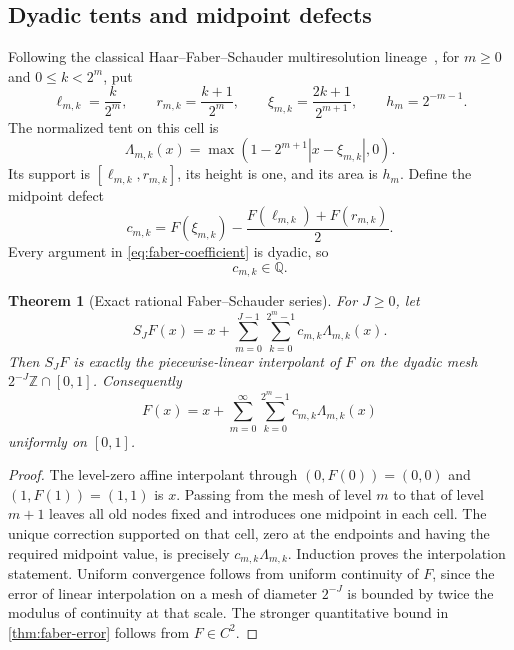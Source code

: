 \documentclass[11pt,oneside]{article}
\newtheorem{theorem}{Theorem}[section]
\theoremstyle{definition}
\theoremstyle{remark}
\newcommand{\Q}{\mathbb Q}
\newcommand{\Z}{\mathbb Z}
\newcommand{\1}{\mathbf 1}
\begin{document}
\subsection{Dyadic tents and midpoint defects}

Following the classical Haar--Faber--Schauder multiresolution lineage~\cite{haar1910,faber1910,schauder1928,deboor2001}, for $m\ge0$ and $0\le k<2^m$, put
\begin{equation}
 \ell_{m,k}=\frac{k}{2^m},\qquad
 r_{m,k}=\frac{k+1}{2^m},\qquad
 \xi_{m,k}=\frac{2k+1}{2^{m+1}},\qquad
 h_m=2^{-m-1}.                                           \label{eq:faber-cell}
\end{equation}
The normalized tent on this cell is
\begin{equation}
 \Lambda_{m,k}(x)=
 \max\!\left(1-2^{m+1}|x-\xi_{m,k}|,0\right).            \label{eq:faber-tent}
\end{equation}
Its support is $[\ell_{m,k},r_{m,k}]$, its height is one,
and its area is $h_m$.  Define the midpoint defect
\begin{equation}
 c_{m,k}=F(\xi_{m,k})-\frac{F(\ell_{m,k})+F(r_{m,k})}{2}. \label{eq:faber-coefficient}
\end{equation}
Every argument in \eqref{eq:faber-coefficient} is dyadic, so
\begin{equation}
 c_{m,k}\in\Q.                                           \label{eq:faber-rational}
\end{equation}

\begin{theorem}[Exact rational Faber--Schauder series]
\label{thm:faber-series}
For $J\ge0$, let
\begin{equation}
 S_JF(x)=x+\sum_{m=0}^{J-1}\sum_{k=0}^{2^m-1}
              c_{m,k}\Lambda_{m,k}(x).                   \label{eq:faber-partial}
\end{equation}
Then $S_JF$ is exactly the piecewise-linear interpolant of $F$ on the dyadic
mesh $2^{-J}\Z\cap[0,1]$.  Consequently
\begin{equation}
 \boxed{\displaystyle
 F(x)=x+\sum_{m=0}^\infty\sum_{k=0}^{2^m-1}
 c_{m,k}\Lambda_{m,k}(x)}                               \label{eq:faber-series}
\end{equation}
uniformly on $[0,1]$.
\end{theorem}

\begin{proof}
The level-zero affine interpolant through $(0,F(0))=(0,0)$ and
$(1,F(1))=(1,1)$ is $x$.  Passing from the mesh of level $m$ to that of level
$m+1$ leaves all old nodes fixed and introduces one midpoint in each cell.
The unique correction supported on that cell, zero at the endpoints and
having the required midpoint value, is precisely
$c_{m,k}\Lambda_{m,k}$.  Induction proves the interpolation statement.
Uniform convergence follows from uniform continuity of $F$, since the error
of linear interpolation on a mesh of diameter $2^{-J}$ is bounded by twice
the modulus of continuity at that scale.  The stronger quantitative bound in
\cref{thm:faber-error} follows from $F\in C^2$.
\end{proof}
\end{document}
